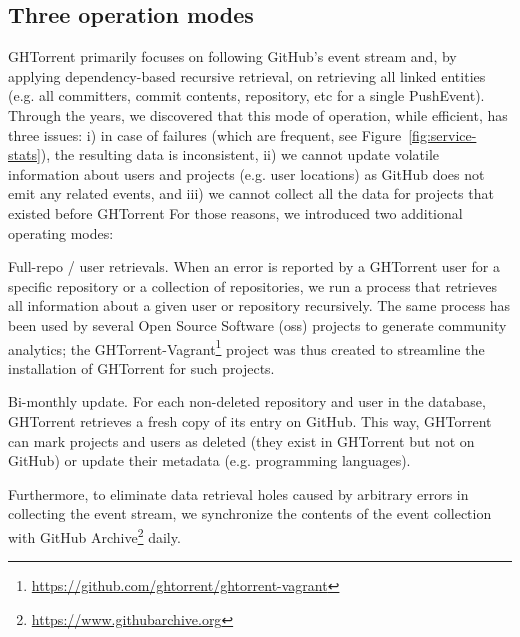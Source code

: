\documentclass{sig-alternate}
\begin{document}
\subsection{Three operation modes}

GHTorrent primarily focuses on following GitHub's event stream and, by applying
dependency-based recursive retrieval, on retrieving all linked entities (e.g.  all
committers, commit contents, repository, etc for a single PushEvent).
Through the years, we discovered that this mode of operation, while efficient,
has three issues: i) in case of failures (which are frequent, see
Figure~\ref{fig:service-stats}), the resulting data is inconsistent,
ii) we cannot update volatile information about users and projects (e.g. user
locations) as GitHub does not emit any related events, and
iii) we cannot collect all the data for projects that existed before GHTorrent
For those reasons, we introduced two additional operating modes:

\begin{compactdesc}

  \item[Full-repo / user retrievals.] When an error is reported by a GHTorrent
    user for a specific repository or a collection of repositories, we run a
    process that retrieves all information about a given user or repository
    recursively. The same process has been used by several Open Source Software
    ({\sc oss}) projects to generate community analytics; the
    GHTorrent-Vagrant\footnote{\url{https://github.com/ghtorrent/ghtorrent-vagrant}}
    project was thus created to streamline the installation of GHTorrent for
    such projects.

  \item[Bi-monthly update.] For each non-deleted repository and user in the
    database, GHTorrent retrieves a fresh copy of its entry on GitHub. This way,
    GHTorrent can mark projects and users as deleted (they exist in GHTorrent
    but not on GitHub) or update their metadata (e.g. programming
    languages).

\end{compactdesc}

Furthermore, to eliminate data retrieval holes caused by arbitrary errors in
collecting the event stream, we synchronize the contents of the event collection
with GitHub Archive\footnote{\url{https://www.githubarchive.org}} daily.
\end{document}
